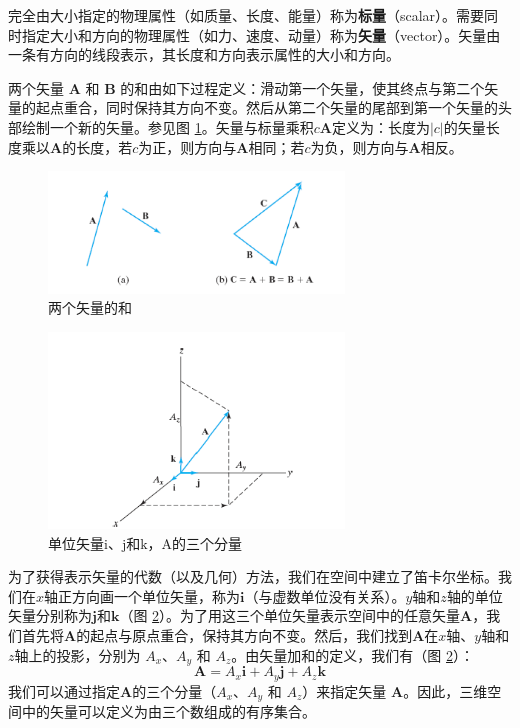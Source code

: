     完全由大小指定的物理属性（如质量、长度、能量）称为\textbf{标量}（scalar）。需要同时指定大小和方向的物理属性（如力、速度、动量）称为\textbf{矢量}（vector）。矢量由一条有方向的线段表示，其长度和方向表示属性的大小和方向。

    两个矢量 $\mathbf{A}$ 和 $\mathbf{B}$ 的和由如下过程定义：滑动第一个矢量，使其终点与第二个矢量的起点重合，同时保持其方向不变。然后从第二个矢量的尾部到第一个矢量的头部绘制一个新的矢量。参见图 \ref{fig:5.1}。矢量与标量乘积$c\mathbf{A}$定义为：长度为$\left|c\right|$的矢量长度乘以$\mathbf{A}$的长度，若$c$为正，则方向与$\mathbf{A}$相同；若$c$为负，则方向与$\mathbf{A}$相反。
    \begin{figure}[ht]
        \centering
        \includegraphics[width=0.7\textwidth]{Figures/5.1.png}
        \caption{两个矢量的和}
        \label{fig:5.1}
    \end{figure}
    \begin{figure}[ht]
        \centering
        \includegraphics[width=0.7\textwidth]{Figures/5.2.png}
        \caption{单位矢量$\mathrm{i}$、$\mathrm{j}$和$\mathrm{k}$，$\mathrm{A}$的三个分量}
        \label{fig:5.2}
    \end{figure}

    为了获得表示矢量的代数（以及几何）方法，我们在空间中建立了笛卡尔坐标。我们在$x$轴正方向画一个单位矢量，称为$\mathbf{i}$（与虚数单位没有关系）。$y$轴和$z$轴的单位矢量分别称为$\mathbf{j}$和$\mathbf{k}$（图 \ref{fig:5.2}）。为了用这三个单位矢量表示空间中的任意矢量$\mathbf{A}$，我们首先将$\mathbf{A}$的起点与原点重合，保持其方向不变。然后，我们找到$\mathbf{A}$在$x$轴、$y$轴和$z$轴上的投影，分别为 $A_x$、$A_y$ 和 $A_z$。由矢量加和的定义，我们有（图 \ref{fig:5.2}）：
    \begin{equation}
        \boxed{
            \mathbf{A} = A_x\mathbf{i} + A_y\mathbf{j} + A_z\mathbf{k}
        }
        \label{eq:5.17}
    \end{equation}
    我们可以通过指定$\mathbf{A}$的三个分量（$A_x$、$A_y$ 和 $A_z$）来指定矢量 $\mathbf{A}$。因此，三维空间中的矢量可以定义为由三个数组成的有序集合。

